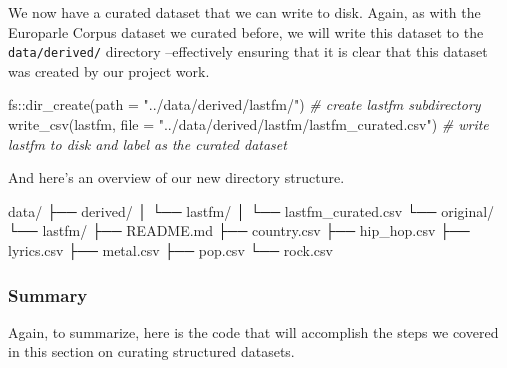 \documentclass[
]{article}
\newenvironment{Shaded}{\begin{snugshade}}{\end{snugshade}}
\newcommand{\AttributeTok}[1]{\textcolor[rgb]{0.77,0.63,0.00}{#1}}
\newcommand{\CommentTok}[1]{\textcolor[rgb]{0.56,0.35,0.01}{\textit{#1}}}
\newcommand{\ExtensionTok}[1]{#1}
\newcommand{\FunctionTok}[1]{\textcolor[rgb]{0.00,0.00,0.00}{#1}}
\newcommand{\NormalTok}[1]{#1}
\newcommand{\SpecialCharTok}[1]{\textcolor[rgb]{0.00,0.00,0.00}{#1}}
\newcommand{\StringTok}[1]{\textcolor[rgb]{0.31,0.60,0.02}{#1}}
\begin{document}
We now have a curated dataset that we can write to disk. Again, as with the Europarle Corpus dataset we curated before, we will write this dataset to the \texttt{data/derived/} directory --effectively ensuring that it is clear that this dataset was created by our project work.

\begin{Shaded}
\begin{Highlighting}[]
\NormalTok{fs}\SpecialCharTok{::}\FunctionTok{dir\_create}\NormalTok{(}\AttributeTok{path =} \StringTok{"../data/derived/lastfm/"}\NormalTok{)  }\CommentTok{\# create lastfm subdirectory}
\FunctionTok{write\_csv}\NormalTok{(lastfm, }\AttributeTok{file =} \StringTok{"../data/derived/lastfm/lastfm\_curated.csv"}\NormalTok{)  }\CommentTok{\# write lastfm to disk and label as the curated dataset}
\end{Highlighting}
\end{Shaded}

And here's an overview of our new directory structure.

\begin{Shaded}
\begin{Highlighting}[]
\ExtensionTok{data/}
\ExtensionTok{├──}\NormalTok{ derived/}
\ExtensionTok{│}\NormalTok{   └── lastfm/}
\ExtensionTok{│}\NormalTok{       └── lastfm\_curated.csv}
\ExtensionTok{└──}\NormalTok{ original/}
    \ExtensionTok{└──}\NormalTok{ lastfm/}
        \ExtensionTok{├──}\NormalTok{ README.md}
        \ExtensionTok{├──}\NormalTok{ country.csv}
        \ExtensionTok{├──}\NormalTok{ hip\_hop.csv}
        \ExtensionTok{├──}\NormalTok{ lyrics.csv}
        \ExtensionTok{├──}\NormalTok{ metal.csv}
        \ExtensionTok{├──}\NormalTok{ pop.csv}
        \ExtensionTok{└──}\NormalTok{ rock.csv}
\end{Highlighting}
\end{Shaded}

\hypertarget{summary-6}{%
\subsubsection{Summary}\label{summary-6}}

Again, to summarize, here is the code that will accomplish the steps we covered in this section on curating structured datasets.
\end{document}

